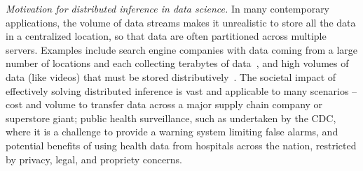 \documentclass[12pt]{article}
\newenvironment{packed_item}{
\begin{itemize}
  \setlength{\itemindent}{-0em}
  \setlength{\itemsep}{-0em}
  \setlength{\parskip}{-0em}
  \setlength{\parsep}{-0em}
}{\end{itemize}}
\begin{document}
{\it Motivation for distributed inference in data science.}
In many  contemporary applications,  the volume of  data streams makes it unrealistic to store all the data in a centralized location,  so that data are often partitioned across multiple servers. Examples include search engine companies with data coming  from a large number of locations and each collecting terabytes of data~\cite{Corbett-et-al2012}, and high volumes of data (like videos) that must be stored distributively~\cite{Mitra-et-al2011}. The societal impact of effectively solving distributed inference is vast and applicable to many scenarios -- cost and volume to transfer data across a major supply chain company or superstore giant;  public health surveillance, such as undertaken by the CDC, where it is a challenge to provide a warning system limiting false alarms, and potential benefits of using health data from hospitals across the nation, restricted by privacy, legal, and propriety concerns.
%
%
\end{document}
